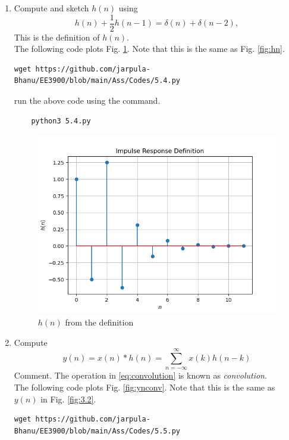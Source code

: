 \documentclass[journal,12pt,twocolumn]{IEEEtran}
\renewcommand\thesection{\arabic{section}}
\begin{document}
\begin{enumerate}[label=\thesection.\arabic*
,ref=\thesection.\theenumi]
\item Compute and sketch $h(n)$ using 
\begin{equation}
\label{eq:iir_filter_h}
h(n) + \frac{1}{2}h(n-1) = \delta(n) + \delta(n-2), 
\end{equation}
%
This is the definition of $h(n)$.
\\
\solution The following code plots Fig. \ref{fig:hndef}. Note that this is the same as Fig. 
\ref{fig:hn}. 
%
\begin{lstlisting}
wget https://github.com/jarpula-Bhanu/EE3900/blob/main/Ass/Codes/5.4.py
\end{lstlisting}
run the above code using the command.
\begin{lstlisting}
	python3 5.4.py
\end{lstlisting}
\begin{figure}[!ht]
\centering
\includegraphics[width=\columnwidth]{./figs/5.4.png}
\caption{$h(n)$ from the definition}
\label{fig:hndef}
\end{figure}
%
\item Compute 
%
\begin{equation}
\label{eq:convolution}
y(n) = x(n)*h(n) = \sum_{n=-\infty}^{\infty}x(k)h(n-k)
\end{equation}
%
Comment. The operation in \eqref{eq:convolution} is known as
{\em convolution}.
%
\\
\solution The following code plots Fig. \ref{fig:ynconv}. Note that this is the same as 
$y(n)$ in  Fig. 
\ref{fig:3.2}. 
%
\begin{lstlisting}
wget https://github.com/jarpula-Bhanu/EE3900/blob/main/Ass/Codes/5.5.py

\end{lstlisting}
\end{enumerate}
\end{document}
